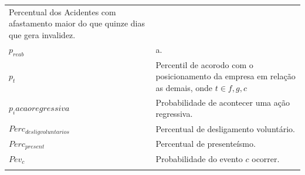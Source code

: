 \documentclass[]{article}
\begin{document}
\begin{longtable}[]{@{}ll@{}}
\begin{minipage}[t]{0.87\columnwidth}
Percentual dos Acidentes com afastamento maior do que quinze dias que
gera invalidez.\strut
\end{minipage}\tabularnewline
\begin{minipage}[t]{0.07\columnwidth}\raggedright\strut
\(p_{reab}\)\strut
\end{minipage} & \begin{minipage}[t]{0.87\columnwidth}\raggedright\strut
a.\strut
\end{minipage}\tabularnewline
\begin{minipage}[t]{0.07\columnwidth}\raggedright\strut
\(p_{t}\)\strut
\end{minipage} & \begin{minipage}[t]{0.87\columnwidth}\raggedright\strut
Percentil de acorodo com o posicionamento da empresa em relação as
demais, onde \(t \in {f,g,c}\)\strut
\end{minipage}\tabularnewline
\begin{minipage}[t]{0.07\columnwidth}\raggedright\strut
\(p_iacaoregressiva\)\strut
\end{minipage} & \begin{minipage}[t]{0.87\columnwidth}\raggedright\strut
Probabilidade de acontecer uma ação regressiva.\strut
\end{minipage}\tabularnewline
\begin{minipage}[t]{0.07\columnwidth}\raggedright\strut
\(Perc_{desligvoluntarios}\)\strut
\end{minipage} & \begin{minipage}[t]{0.87\columnwidth}\raggedright\strut
Percentual de desligamento voluntário.\strut
\end{minipage}\tabularnewline
\begin{minipage}[t]{0.07\columnwidth}\raggedright\strut
\(Perc_{present}\)\strut
\end{minipage} & \begin{minipage}[t]{0.87\columnwidth}\raggedright\strut
Percentual de presenteísmo.\strut
\end{minipage}\tabularnewline
\begin{minipage}[t]{0.07\columnwidth}\raggedright\strut
\(Pev_{c}\)\strut
\end{minipage} & \begin{minipage}[t]{0.87\columnwidth}\raggedright\strut
Probabilidade do evento \(c\) ocorrer.\strut
\end{minipage}\tabularnewline
\begin{minipage}[t]{0.07\columnwidth}\raggedright\strut

\end{minipage}
\end{longtable}
\end{document}
